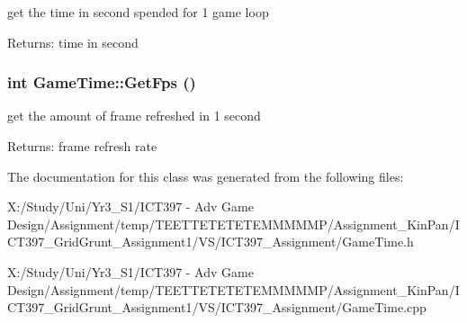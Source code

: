 get the time in second spended for 1 game loop \begin{Desc}
\item[Returns:]time in second \end{Desc}
\hypertarget{class_game_time_2fd3b8071acff2c5f8f9e18c72914a1b}{
\subsubsection[GetFps]{\setlength{\rightskip}{0pt plus 5cm}int GameTime::GetFps ()}}
\label{class_game_time_2fd3b8071acff2c5f8f9e18c72914a1b}


get the amount of frame refreshed in 1 second \begin{Desc}
\item[Returns:]frame refresh rate \end{Desc}


The documentation for this class was generated from the following files:\begin{CompactItemize}
\item 
X:/Study/Uni/Yr3\_\-S1/ICT397 - Adv Game Design/Assignment/temp/TEETTETETETEMMMMMP/Assignment\_\-KinPan/ICT397\_\-GridGrunt\_\-Assignment1/VS/ICT397\_\-Assignment/GameTime.h\item 
X:/Study/Uni/Yr3\_\-S1/ICT397 - Adv Game Design/Assignment/temp/TEETTETETETEMMMMMP/Assignment\_\-KinPan/ICT397\_\-GridGrunt\_\-Assignment1/VS/ICT397\_\-Assignment/GameTime.cpp\end{CompactItemize}
